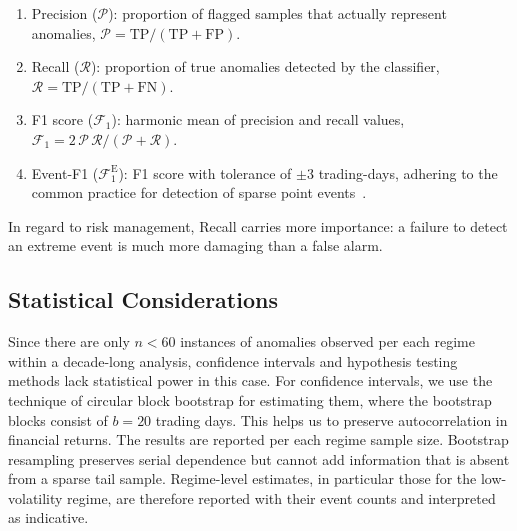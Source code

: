 \documentclass[]{interact}
\begin{document}
\begin{enumerate}[label=\arabic*., itemsep=3pt]
	\item Precision ($\mathcal{P}$): proportion of flagged samples that actually represent anomalies,
          $\mathcal{P} = \mathrm{TP}/(\mathrm{TP}+\mathrm{FP})$.

    \item Recall ($\mathcal{R}$): proportion of true anomalies detected by the classifier,
          $\mathcal{R} = \mathrm{TP}/(\mathrm{TP}+\mathrm{FN})$.

    \item F1 score ($\mathcal{F}_{1}$): harmonic mean of precision and recall values,
          $\mathcal{F}_{1} = {2\,\mathcal{P}\,\mathcal{R}}/{(\mathcal{P}+\mathcal{R})}$.

    \item Event-F1 ($\mathcal{F}_{1}^{\mathrm{E}}$): F1 score with tolerance of $\pm3$ trading-days,
       adhering to the common practice for detection of sparse point events~\citep{liu2024times}.
\end{enumerate}

In regard to risk management, Recall carries more importance: a failure to detect an extreme event is much more damaging than a false alarm.

\subsection{Statistical Considerations}
\label{subsec:statistical}
Since there are only $n < 60$ instances of anomalies observed per each regime within a decade-long analysis, confidence intervals and hypothesis testing methods lack statistical power in this case. For confidence intervals, we use the technique of circular block bootstrap for estimating them, where the bootstrap blocks consist of $b=20$ trading days. This helps us to preserve autocorrelation in financial returns. The results are reported per each regime sample size. Bootstrap resampling preserves serial dependence but cannot add information that is absent from a sparse tail sample. Regime-level estimates, in particular those for the low-volatility regime, are therefore reported with their event counts and interpreted as indicative.

\end{document}
